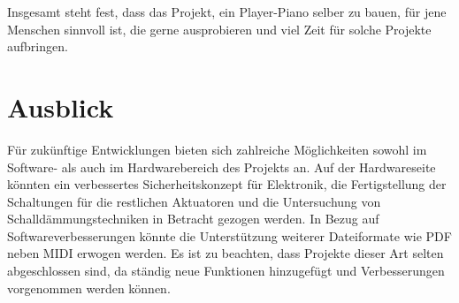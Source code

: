 Insgesamt steht fest, dass das Projekt, ein Player-Piano selber zu bauen, für jene Menschen sinnvoll ist, die gerne
ausprobieren und viel Zeit für solche Projekte aufbringen.


\section{Ausblick}

Für zukünftige Entwicklungen bieten sich zahlreiche Möglichkeiten sowohl im Software- als auch im Hardwarebereich des Projekts an.
Auf der Hardwareseite könnten ein verbessertes Sicherheitskonzept für Elektronik, die Fertigstellung der Schaltungen für die restlichen Aktuatoren und die Untersuchung von Schalldämmungstechniken in Betracht gezogen werden.
In Bezug auf Softwareverbesserungen könnte die Unterstützung weiterer Dateiformate wie PDF neben MIDI erwogen werden.
Es ist zu beachten, dass Projekte dieser Art selten abgeschlossen sind, da ständig neue Funktionen hinzugefügt und Verbesserungen vorgenommen werden können.

